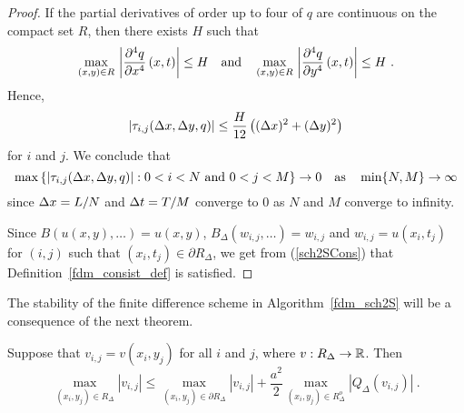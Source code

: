 \begin{proof}
If the partial derivatives of order up to four of $q$ are continuous on the
compact set $R$, then there exists $H$ such that
\[
\max_{(x,y)\in R}\, \left|\frac{\partial^{4}{q}}{\partial{x}^{4}}\left(x,t\right) \right| \leq
H \quad \text{and} \quad 
\max_{(x,y)\in R}\, \left|\frac{\partial^{4}{q}}{\partial{y}^{4}}\left(x,t\right) \right| \leq
H \ .
\]
Hence,
\begin{equation} \label{fdm_sch2STrunc}
\left| \tau_{i,j}(\Delta{x},\Delta{y},q) \right | \leq
\frac{H}{12} \left( (\Delta{x})^2 + (\Delta{y})^2\right)
\end{equation}
for $i$ and $j$.  We conclude that
\begin{equation} \label{sch2SCons}
\max \left\{ \left|\tau_{i,j}(\Delta{x},\Delta{y},q)\right| :
0<i<N \ \text{and} \ 0 < j < M
\right\} \rightarrow 0 \quad \text{as} \quad \min \{N, M\} \rightarrow \infty
\end{equation}
since $\Delta{x} = L/N$ and $\Delta{t} = T/M$ converge to $0$ as $N$ and
$M$ converge to infinity.

Since $\displaystyle B\left(u(x,y), \ldots \right) = u(x,y)$,
$\displaystyle B_\Delta(w_{i,j},\ldots) = w_{i,j}$ and $w_{i,j} = u(x_i,t_j)$
for $(i,j)$ such that $(x_i,t_j) \in \partial R_\Delta$, we get from 
(\ref{sch2SCons}) that Definition~\ref{fdm_consist_def} is satisfied.
\end{proof}

The stability of the finite difference scheme in
Algorithm~\ref{fdm_sch2S} will be a consequence of the next theorem.

\begin{theorem} \label{LaplaceVdeltaVInequ}
Suppose that $v_{i,j} = v(x_i,y_j)$ for all $i$ and $j$, where
$v:R_\Delta \to \mathbb{R}$.  Then
\[
\max_{(x_i,y_j) \in R_\Delta} |v_{i,j}|
\leq \max_{(x_i,y_j) \in \partial R_\Delta} |v_{i,j}|
+ \frac{a^2}{2} \max_{(x_i,y_j) \in R^o_\Delta}
\left|Q_\Delta(v_{i,j})\right| \ .
\]
\end{theorem}

